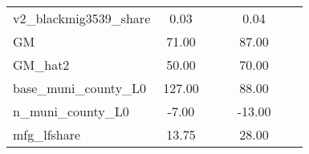 \begin{table}[htbp]
\begin{tabular}{l*{2}{ccc}}
v2\_blackmig3539\_share&        0.03&            &            &        0.04&            &            \\
GM                  &       71.00&            &            &       87.00&            &            \\
GM\_hat2             &       50.00&            &            &       70.00&            &            \\
base\_muni\_county\_L0 &      127.00&            &            &       88.00&            &            \\
n\_muni\_county\_L0    &       -7.00&            &            &      -13.00&            &            \\
mfg\_lfshare         &       13.75&            &            &       28.00&            &            \\
\bottomrule
\end{tabular}
\end{table}
